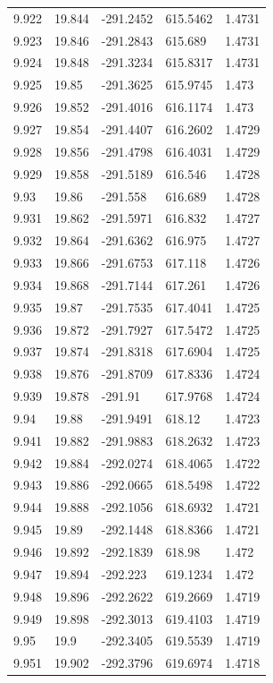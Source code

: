 \begin{tabular}{lllll}
9.922 & 19.844 & -291.2452 & 615.5462 & 1.4731 \\
9.923 & 19.846 & -291.2843 & 615.689 & 1.4731 \\
9.924 & 19.848 & -291.3234 & 615.8317 & 1.4731 \\
9.925 & 19.85 & -291.3625 & 615.9745 & 1.473 \\
9.926 & 19.852 & -291.4016 & 616.1174 & 1.473 \\
9.927 & 19.854 & -291.4407 & 616.2602 & 1.4729 \\
9.928 & 19.856 & -291.4798 & 616.4031 & 1.4729 \\
9.929 & 19.858 & -291.5189 & 616.546 & 1.4728 \\
9.93 & 19.86 & -291.558 & 616.689 & 1.4728 \\
9.931 & 19.862 & -291.5971 & 616.832 & 1.4727 \\
9.932 & 19.864 & -291.6362 & 616.975 & 1.4727 \\
9.933 & 19.866 & -291.6753 & 617.118 & 1.4726 \\
9.934 & 19.868 & -291.7144 & 617.261 & 1.4726 \\
9.935 & 19.87 & -291.7535 & 617.4041 & 1.4725 \\
9.936 & 19.872 & -291.7927 & 617.5472 & 1.4725 \\
9.937 & 19.874 & -291.8318 & 617.6904 & 1.4725 \\
9.938 & 19.876 & -291.8709 & 617.8336 & 1.4724 \\
9.939 & 19.878 & -291.91 & 617.9768 & 1.4724 \\
9.94 & 19.88 & -291.9491 & 618.12 & 1.4723 \\
9.941 & 19.882 & -291.9883 & 618.2632 & 1.4723 \\
9.942 & 19.884 & -292.0274 & 618.4065 & 1.4722 \\
9.943 & 19.886 & -292.0665 & 618.5498 & 1.4722 \\
9.944 & 19.888 & -292.1056 & 618.6932 & 1.4721 \\
9.945 & 19.89 & -292.1448 & 618.8366 & 1.4721 \\
9.946 & 19.892 & -292.1839 & 618.98 & 1.472 \\
9.947 & 19.894 & -292.223 & 619.1234 & 1.472 \\
9.948 & 19.896 & -292.2622 & 619.2669 & 1.4719 \\
9.949 & 19.898 & -292.3013 & 619.4103 & 1.4719 \\
9.95 & 19.9 & -292.3405 & 619.5539 & 1.4719 \\
9.951 & 19.902 & -292.3796 & 619.6974 & 1.4718 \\

\end{tabular}
